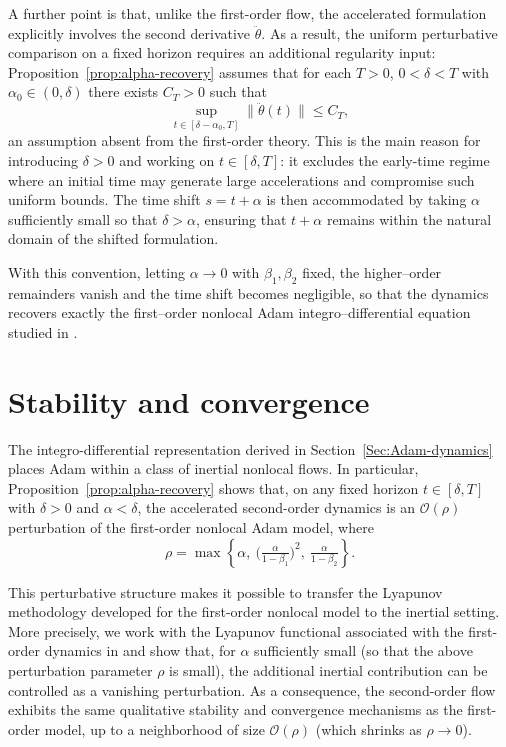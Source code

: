 \documentclass{article} %
\begin{document}
A further point is that, unlike the first-order flow, the accelerated formulation explicitly involves the second derivative \(\ddot{\theta}\). As a result, the uniform perturbative comparison on a fixed horizon requires an additional regularity input: Proposition~\ref{prop:alpha-recovery} assumes that for each \(T>0\), $0<\delta <T$ with $\alpha_0\in(0,\delta)$ there exists \(C_T>0\) such that
\[
\sup_{t\in[\delta-\alpha_0,T]} \|\ddot{\theta}(t)\| \le C_T,
\]
an assumption absent from the first-order theory. This is the main reason for introducing \(\delta>0\) and working on \(t\in[\delta,T]\): it excludes the early-time regime where an initial time may generate large accelerations and compromise such uniform bounds. The time shift \(s=t+\alpha\) is then accommodated by taking \(\alpha\) sufficiently small so that \(\delta>\alpha\), ensuring that \(t+\alpha\) remains within the natural domain of the shifted formulation.

With this convention, letting $\alpha\to 0$ with $\beta_1,\beta_2$ fixed, the higher–order remainders vanish and the time shift becomes negligible, so that the dynamics recovers exactly the first–order nonlocal Adam integro–differential equation studied in \cite{heredia2025modelingadagradrmspropadam}.


\section{Stability and convergence}\label{sec:stability}

The integro-differential representation derived in Section~\ref{Sec:Adam-dynamics} places Adam within a class of inertial nonlocal flows. In particular, Proposition~\ref{prop:alpha-recovery} shows that, on any fixed horizon $t\in[\delta,T]$ with $\delta>0$ and $\alpha<\delta$, the accelerated second-order dynamics is an $\mathcal{O}(\rho)$ perturbation of the first-order nonlocal Adam model, where
\[
\rho=\max\left\{\alpha,\ \Big(\tfrac{\alpha}{1-\beta_1}\Big)^2,\ \tfrac{\alpha}{1-\beta_2}\right\}.
\]

This perturbative structure makes it possible to transfer the Lyapunov methodology developed for the first-order nonlocal model to the inertial setting. More precisely, we work with the Lyapunov functional associated with the first-order dynamics in \cite{heredia2025modelingadagradrmspropadam} and show that, for $\alpha$ sufficiently small (so that the above perturbation parameter $\rho$ is small), the additional inertial contribution can be controlled as a vanishing perturbation. As a consequence, the second-order flow exhibits the same qualitative stability and convergence mechanisms as the first-order model, up to a neighborhood of size $\mathcal{O}(\rho)$ (which shrinks as $\rho\to 0$).
\end{document}
